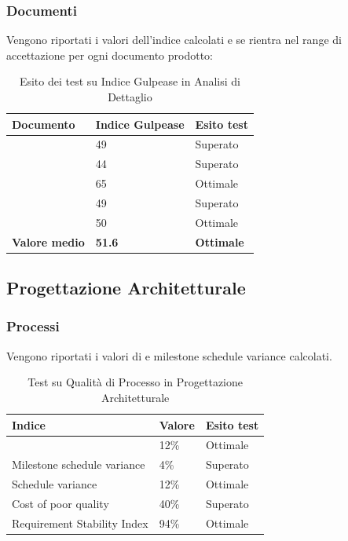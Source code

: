\documentclass[12pt,a4paper]{article}
\begin{document}
\subsubsection{Documenti}
Vengono riportati i valori dell'indice  calcolati e se rientra nel range di accettazione per ogni documento prodotto:
\begin{table}[H]
	\begin{center}
		\begin{tabular}{p{} p{} p{}}
			\toprule
			\textbf{Documento}   & \textbf{Indice Gulpease}	& \textbf{Esito test} \\ \midrule
			\midrule
			\NdP & 49 &  Superato \\ \midrule
			\SdF & 44 &  Superato \\ \midrule
			\AdR & 65 &  Ottimale \\ \midrule
			\PdP & 49 &  Superato \\ \midrule
			\PdQ & 50 &  Ottimale \\ \midrule\midrule
			\textbf{Valore medio} & \textbf{51.6}& \textbf{Ottimale}\\ 
			\bottomrule
		\end{tabular}
		\caption{Esito dei test su Indice Gulpease in Analisi di Dettaglio}
	\end{center}
\end{table}
\subsection{Progettazione Architetturale}
\subsubsection{Processi}
Vengono riportati i valori di  e  milestone schedule variance calcolati. 

\begin{table}[H]
	\begin{center}
		\begin{tabular}{p{} p{} p{}}
			\toprule
			\textbf{Indice}   & \textbf{Valore}	& \textbf{Esito test} \\ \midrule
			\midrule
			\mgls{cost variance} & 12\% &  Ottimale \\ \midrule
			Milestone schedule variance & 4\% & Superato\\ \midrule
			Schedule variance & 12\% & Ottimale\\ \midrule
			Cost of poor quality & 40\% & Superato \\ \midrule
			Requirement Stability Index & 94\% & Ottimale\\ \bottomrule
		\end{tabular}	
	\end{center}
	\caption{Test su Qualità di Processo in Progettazione Architetturale}
\end{table}
\end{document}
